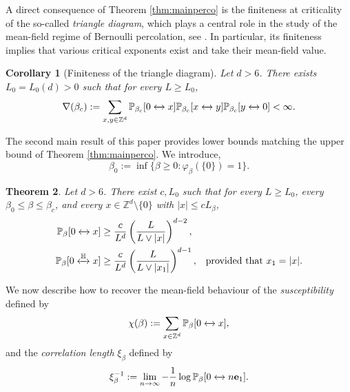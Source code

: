 \documentclass[11pt,a4paper]{article}
\numberwithin{equation}{section}
\theoremstyle{plain}
\newtheorem{Thm}{Theorem}[section]
\newtheorem{Cor}[Thm]{Corollary}
\theoremstyle{definition}
\newcommand{\connect}{\xleftrightarrow}
\begin{document}
A direct consequence of Theorem \ref{thm:mainperco} is the finiteness at criticality of the so-called \emph{triangle diagram}, which plays a central role in the study of the mean-field regime of Bernoulli percolation, see \cite{AizenmanNewmanTreeGraphInequalities1984,HaraSlade1990Perco,BarskyAizenmanCriticalExponentPercoUnderTriangle1991,SladeSaintFlourLaceExpansion2006}. In particular, its finiteness implies that various critical exponents exist and take their mean-field value.
\begin{Cor}[Finiteness of the triangle diagram]\label{cor: finiteness triangle} Let $d>6$. There exists $L_0=L_0(d)>0$ such that for every $L\geq L_0$,
\begin{equation}
	\nabla(\beta_c):=\sum_{x,y\in \mathbb Z^d}\mathbb P_{\beta_c}[0\connect{}x]\mathbb P_{\beta_c}[x\connect{}y]\mathbb P_{\beta_c}[y\connect{}0]<\infty.
\end{equation}
\end{Cor}

The second main result of this paper provides lower bounds matching the upper bound of Theorem \ref{thm:mainperco}. We introduce, 
\begin{equation}
	\beta_0:=\inf\{\beta \geq 0 : \varphi_\beta(\{0\})=1\}.
\end{equation}
\begin{Thm}\label{thm:main2perco} Let $d>6$. There exist $c,L_0$ such that for every $L\geq L_0$, every $\beta_0\leq\beta\leq \beta_c$, and every $x\in \mathbb Z^d\setminus \{0\}$ with $|x|\leq cL_\beta$,
	\begin{align}
\label{eq:lowerbound full plane perco}
\mathbb P_\beta[0\connect{}x]&\ge \frac{c}{L^d}\left(\frac{L}{L\vee |x|}\right)^{d-2}, &\\
\label{eq:lowerbound half plane perco} \mathbb P_\beta[0\connect{\mathbb H\:}x]&\ge \frac{c}{L^d}\left(\frac{L}{L\vee |x_1|}\right)^{d-1}, &\text{provided that }x_1=|x|.
\end{align} 
\end{Thm}




We now describe how to recover the mean-field behaviour of the \emph{susceptibility} defined by
\begin{equation}
	\chi(\beta):=\sum_{x\in \mathbb Z^d}\mathbb P_\beta[0\connect{}x],
\end{equation}
and the \emph{correlation length} $\xi_\beta$ defined by
\begin{equation}\label{eq:def corr length paper perco}
	\xi_\beta^{-1}:=\lim_{n\rightarrow \infty}-\frac{1}{n}\log \mathbb P_\beta[0\connect{}n\mathbf{e}_1].
\end{equation}
\end{document}
